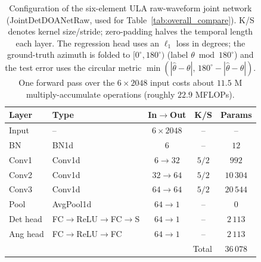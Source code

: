 \documentclass[5p,twocolumn]{elsarticle}
\begin{document}
\begin{table}[t]
\centering
\caption{Configuration of the six-element ULA raw-waveform joint network (JointDetDOANetRaw, used for Table~\ref{tab:overall_compare}). K/S denotes kernel size/stride; zero-padding halves the temporal length each layer. The regression head uses an $\ell_1$ loss in degrees; the ground-truth azimuth is folded to $[0^\circ,180^\circ)$ (label $\theta\bmod 180^\circ$) and the test error uses the circular metric $\min\left(|\hat{\theta}-\theta|,\,180^\circ-|\hat{\theta}-\theta|\right)$. One forward pass over the $6\times2048$ input costs about $11.5$ M multiply-accumulate operations (roughly $22.9$ MFLOPs).}
\label{tab:net}
\small
\setlength{\tabcolsep}{4pt}
\begin{tabular}{llccc}
\toprule
Layer & Type & In$\rightarrow$Out & K/S & Params \\
\midrule
Input & -- & $6\times2048$ & -- & -- \\
BN & BN1d & $6$ & -- & $12$ \\
Conv1 & Conv1d & $6\to32$ & $5/2$ & $992$ \\
Conv2 & Conv1d & $32\to64$ & $5/2$ & $10\,304$ \\
Conv3 & Conv1d & $64\to64$ & $5/2$ & $20\,544$ \\
Pool & AvgPool1d & $64\to1$ & -- & $0$ \\
Det head & FC$\rightarrow$ReLU$\rightarrow$FC$\rightarrow$S & $64\to1$ & -- & $2\,113$ \\
Ang head & FC$\rightarrow$ReLU$\rightarrow$FC & $64\to1$ & -- & $2\,113$ \\
\midrule
\multicolumn{4}{r}{Total} & $36\,078$ \\
\bottomrule
\end{tabular}
\end{table}
\end{document}
